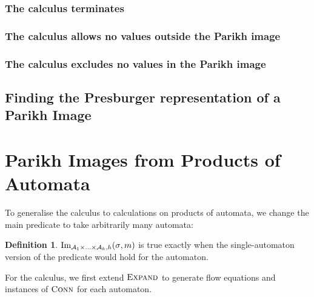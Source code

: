 \documentclass[acmsmall,review,anonymous]{acmart}\settopmatter{printfolios=true,printccs=false,printacmref=true}
\theoremstyle{definition}
\newtheorem{definition}{Definition}[section]
\newif\ifoutline
\newcommand{\contents}[1]{\ifoutline{\color{blue}
    \begin{itemize}
    #1
    \end{itemize}
  }\fi}
\begin{document}
\subsubsection{The calculus terminates}
\subsubsection{The calculus allows no values outside the Parikh image}
\subsubsection{The calculus excludes no values in the Parikh image}

\subsection{Finding the Presburger representation of a Parikh Image}
\contents{
  \item lazy qe
}

\section{Parikh Images from Products of Automata}

To generalise the calculus to calculations on products of automata, we change the main predicate to take arbitrarily many automata:
\begin{definition}
  $\operatorname{Im}_{\mathcal{A}_1\times\ldots\times\mathcal{A}_k, h}(\operatorname{\sigma}, m)$
  is true exactly when the single-automaton version of the predicate would hold
  for the automaton.
\end{definition}

  For the calculus, we first extend $\textsc{Expand}$ to generate flow equations and instances of $\operatorname{\textsc{Conn}}$ for each automaton.
\end{document}
